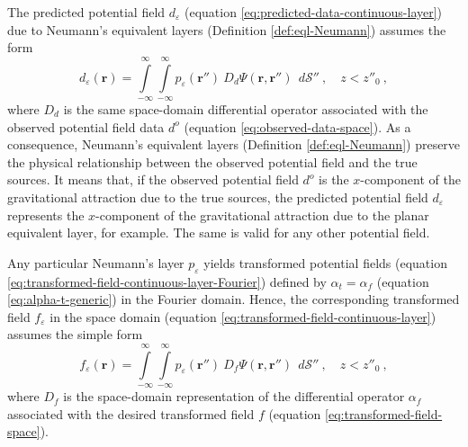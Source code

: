 The predicted potential field $d_{\varepsilon}$ (equation \ref{eq:predicted-data-continuous-layer}) 
due to Neumann's equivalent layers (Definition \ref{def:eql-Neumann}) assumes the form
\begin{equation}
	d_{\varepsilon}(\mathbf{r})
	= \int\limits_{-\infty}^{\infty}\int\limits_{-\infty}^{\infty}
	p_{\varepsilon}(\mathbf{r}'') \: D_{d} \Psi(\mathbf{r}, \mathbf{r}'') \:\: d\mathcal{S}''
	\: , \quad z < z''_{0} \: ,
	\label{eq:predicted-data-Neumann-layer}
\end{equation}
where $D_{d}$ is the same space-domain differential operator associated with
the observed potential field data $d^{o}$ (equation \ref{eq:observed-data-space}).
As a consequence, Neumann's equivalent layers (Definition \ref{def:eql-Neumann}) preserve the physical
relationship between the observed potential field and the true sources.
It means that, if the observed potential field $d^{o}$ is the $x$-component of the 
gravitational attraction due to the true sources, the predicted potential field $d_{\varepsilon}$  
represents the $x$-component of the gravitational attraction due to the planar equivalent layer, for example.
The same is valid for any other potential field.

Any particular Neumann's layer $p_{\varepsilon}$ yields transformed potential 
fields (equation \ref{eq:transformed-field-continuous-layer-Fourier}) 
defined by $\alpha_{t} = \alpha_{f}$ (equation \ref{eq:alpha-t-generic}) in the Fourier domain. 
Hence, the corresponding transformed field $f_{\varepsilon}$ in the space domain 
(equation \ref{eq:transformed-field-continuous-layer}) assumes the simple form
\begin{equation}
	f_{\varepsilon}(\mathbf{r})
	= \int\limits_{-\infty}^{\infty}\int\limits_{-\infty}^{\infty}
	p_{\varepsilon}(\mathbf{r}'') \: D_{f} \Psi(\mathbf{r}, \mathbf{r}'') \:\: d\mathcal{S}''
	\: , \quad z < z''_{0} \: ,
	\label{eq:transformed-field-continuous-layer-Neumann}
\end{equation}
where $D_{f}$ is the space-domain representation of the differential operator $\alpha_{f}$ 
associated with the desired transformed field $f$ (equation \ref{eq:transformed-field-space}).


